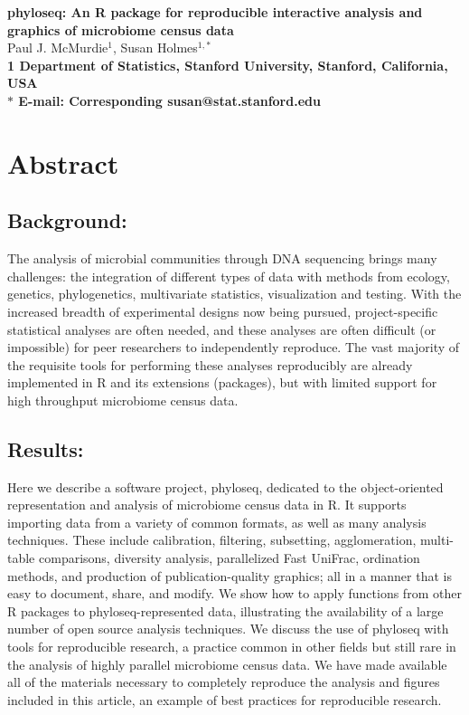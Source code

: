 \documentclass[10pt]{article}\usepackage{graphicx, color}
\date{}
\newcommand{\R}{{\textsf{R}}}
\begin{document}
\begin{flushleft}
{\Large
\textbf{phyloseq: An R package
for reproducible interactive analysis and graphics
of microbiome census data}
}
\\
Paul J. McMurdie$^{1}$, 
Susan Holmes$^{1,\ast}$
\\
\bf{1} Department of Statistics, Stanford University, Stanford, California, USA
\\
$\ast$ E-mail: Corresponding susan@stat.stanford.edu
\end{flushleft}

\section*{Abstract}

\subsection*{Background:}
The analysis of microbial communities through DNA sequencing brings many challenges: 
the integration of different types of data with methods from ecology, genetics, phylogenetics, multivariate statistics, visualization and testing.
With the increased breadth of experimental designs now being pursued,
project-specific statistical analyses are often needed,
and these analyses are often difficult (or impossible)
for peer researchers to independently reproduce.
The vast majority of the requisite tools
for performing these analyses reproducibly
are already implemented in \R{} and its extensions (packages),
but with limited support for high throughput microbiome census data.
           
\subsection*{Results:} 
Here we describe a software project,
phyloseq,
dedicated to the object-oriented representation and analysis
of microbiome census data in \R{}.
It supports importing data from a variety of common formats,
as well as many analysis techniques.
These include
calibration,
filtering,
subsetting,
agglomeration, 
multi-table comparisons,
diversity analysis,
parallelized Fast UniFrac, 
ordination methods, 
and production of publication-quality graphics;
all in a manner that is easy to document, share, and modify.
We show how to apply functions
from other \R{} packages
to phyloseq-represented data,
illustrating the availability
of a large number of open source analysis techniques.
We discuss the use of phyloseq with tools for reproducible research,
a practice common in other fields but still rare in the analysis
of highly parallel microbiome census data.
We have made available all of the materials
necessary to completely reproduce
the analysis and figures included in this article,
an example of best practices for reproducible research.
\end{document}
